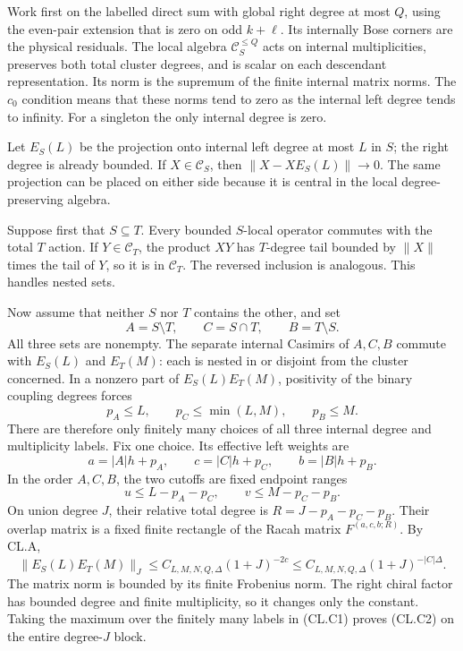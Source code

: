 \documentclass[a4paper,11pt]{article}
\numberwithin{equation}{section}
\begin{document}
Work first on the labelled direct sum with global right degree at most \(Q\), using the even-pair extension that is zero on odd \(k+\ell\). Its internally Bose corners are the physical residuals. The local algebra \(\mathcal C_S^{\leq Q}\) acts on internal multiplicities, preserves both total cluster degrees, and is scalar on each descendant representation. Its norm is the supremum of the finite internal matrix norms. The \(c_0\) condition means that these norms tend to zero as the internal left degree tends to infinity. For a singleton the only internal degree is zero.

Let \(E_S(L)\) be the projection onto internal left degree at most \(L\) in \(S\); the right degree is already bounded. If \(X\in\mathcal C_S\), then \(\|X-XE_S(L)\|\to0\). The same projection can be placed on either side because it is central in the local degree-preserving algebra.

Suppose first that \(S\subseteq T\). Every bounded \(S\)-local operator commutes with the total \(T\) action. If \(Y\in\mathcal C_T\), the product \(XY\) has \(T\)-degree tail bounded by \(\|X\|\) times the tail of \(Y\), so it is in \(\mathcal C_T\). The reversed inclusion is analogous. This handles nested sets.

Now assume that neither \(S\) nor \(T\) contains the other, and set \[
A=S\setminus T,\qquad C=S\cap T,\qquad B=T\setminus S.
\] All three sets are nonempty. The separate internal Casimirs of \(A,C,B\) commute with \(E_S(L)\) and \(E_T(M)\): each is nested in or disjoint from the cluster concerned. In a nonzero part of \(E_S(L)E_T(M)\), positivity of the binary coupling degrees forces \[
p_A\leq L,\qquad p_C\leq\min(L,M),\qquad p_B\leq M.
\tag{CL.C1}
\] There are therefore only finitely many choices of all three internal degree and multiplicity labels. Fix one choice. Its effective left weights are \[
a=|A|h+p_A,\qquad c=|C|h+p_C,\qquad b=|B|h+p_B.
\] In the order \(A,C,B\), the two cutoffs are fixed endpoint ranges \[
u\leq L-p_A-p_C,\qquad v\leq M-p_C-p_B.
\] On union degree \(J\), their relative total degree is \(R=J-p_A-p_C-p_B\). Their overlap matrix is a fixed finite rectangle of the Racah matrix \(F^{(a,c,b;R)}\). By CL.A, \[
\|E_S(L)E_T(M)\|_{J}
\leq C_{L,M,N,Q,\Delta}(1+J)^{-2c}
\leq C_{L,M,N,Q,\Delta}(1+J)^{-|C|\Delta}.
\tag{CL.C2}
\] The matrix norm is bounded by its finite Frobenius norm. The right chiral factor has bounded degree and finite multiplicity, so it changes only the constant. Taking the maximum over the finitely many labels in (CL.C1) proves (CL.C2) on the entire degree-\(J\) block.
\end{document}
